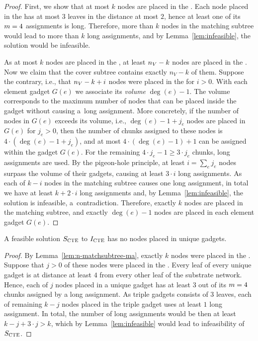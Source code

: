 \begin{proof}
  First, we show that at most $k$ nodes are placed in the \MatchSubtree.
  Each node placed in the \MatchSubtree{} has at most $3$ leaves in the distance at most $2$, hence at least one of its $m=4$ assignments is long.
  Therefore, more than $k$ nodes in the matching subtree would lead to more than $k$ long assignments, and by Lemma~\ref{lem:infeasible}, the solution would be infeasible.
  
  As at most $k$ nodes are placed in the \MatchSubtree{}, at least $n_V-k$ nodes are placed in the \CoverSubtree.
  Now we claim that the cover subtree contains exactly $n_V-k$ of them.
  Suppose the contrary, i.e., that $n_V-k+i$ nodes were placed in the \CoverSubtree{} for $i > 0$.
  With each element gadget $G(e)$ we associate its \emph{volume} $\deg(e) - 1$.
  The volume corresponds to the maximum number of nodes that can be placed inside the gadget without causing a~long assignment.
  More concretely, if the number of nodes in $G(e)$ exceeds its volume, i.e., $\deg(e) - 1 + j_e$ nodes are placed in $G(e)$ for $j_e > 0$,
  then the number of chunks assigned to these nodes is $4\cdot (\deg(e) - 1 + j_e)$, and at most $4\cdot (\deg(e) - 1) + 1$ can be assigned within the gadget $G(e)$.
  For the remaining $4\cdot j_e - 1 \geq 3\cdot j_e$ chunks, long assignments are used.
  By the pigeon-hole principle, at least $i = \sum_e j_e$ nodes surpass the volume of their gadgets, causing at least $3\cdot i$ long assignments.
  As each of $k-i$ nodes in the matching subtree causes one long assignment, in total we have at least $k+2\cdot i$ long assignments and, by Lemma~\ref{lem:infeasible}, the solution is infeasible, a~contradiction.
  Therefore, exactly $k$ nodes are placed in the matching subtree, and exactly $\deg(e) - 1$ nodes are placed in each element gadget $G(e)$.
\end{proof}

\begin{lemma}
  A feasible solution $S_{\mathrm{\textsc{CTE}}}$ to $I_{\mathrm{\textsc{CTE}}}$ has no nodes placed in unique gadgets.
  \label{lem:no-unq-ma}
\end{lemma}
\begin{proof}
  By Lemma~\ref{lem:n-matchsubtree-ma}, exactly $k$ nodes were placed in the \MatchSubtree{}.
  Suppose that $j>0$ of these nodes were placed in the \UnqGadgets{}.
  Every leaf of every unique gadget is at distance at least $4$ from every other leaf of the substrate network.
  Hence, each of $j$ nodes placed in a unique gadget has at least $3$ out of its $m = 4$ chunks assigned by a long assignment.
  As triple gadgets consists of $3$ leaves, each of remaining $k-j$ nodes placed in the triple gadget uses at least $1$ long assignment.
  In total, the number of long assignments would be then at least $k-j + 3\cdot j > k$, which by Lemma~\ref{lem:infeasible} would lead to infeasibility of $S_{\mathrm{\textsc{CTE}}}$.
\end{proof}

